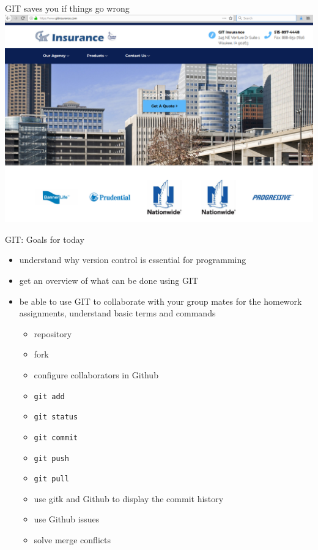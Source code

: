 \begin{frame}[fragile]{GIT saves you if things go wrong}
    \includegraphics[width=\textwidth]{images/git-insurance.png}
\end{frame}


\begin{frame}[fragile]{GIT: Goals for today}
    \begin{itemize}
        \item understand why version control is essential for programming\pause
        \item get an overview of what can be done using GIT\pause
        \item be able to use GIT to collaborate with your group mates for the homework
            assignments, understand basic terms and commands\pause
        \begin{itemize}
            \item repository
            \item fork
            \item configure collaborators in Github
            \item \verb|git add|
            \item \verb|git status|
            \item \verb|git commit|
            \item \verb|git push|
            \item \verb|git pull|
            \item use gitk and Github to display the commit history
            \item use Github issues
            \item solve merge conflicts
        \end{itemize}
    \end{itemize}
\end{frame}


